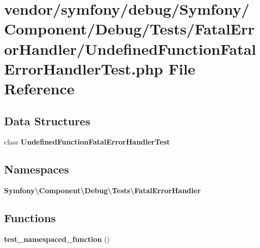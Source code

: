 \section{vendor/symfony/debug/\+Symfony/\+Component/\+Debug/\+Tests/\+Fatal\+Error\+Handler/\+Undefined\+Function\+Fatal\+Error\+Handler\+Test.php File Reference}
\label{_undefined_function_fatal_error_handler_test_8php}
\subsection*{Data Structures}
\begin{DoxyCompactItemize}
\item 
class {\bf Undefined\+Function\+Fatal\+Error\+Handler\+Test}
\end{DoxyCompactItemize}
\subsection*{Namespaces}
\begin{DoxyCompactItemize}
\item 
 {\bf Symfony\textbackslash{}\+Component\textbackslash{}\+Debug\textbackslash{}\+Tests\textbackslash{}\+Fatal\+Error\+Handler}
\end{DoxyCompactItemize}
\subsection*{Functions}
\begin{DoxyCompactItemize}
\item 
{\bf test\+\_\+namespaced\+\_\+function} ()
\end{DoxyCompactItemize}
